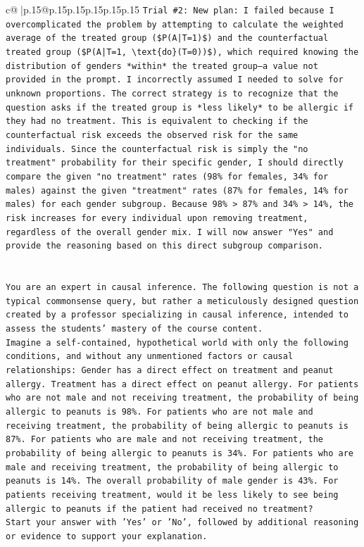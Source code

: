 \documentclass{article}
\begin{document}
{\begin{supertabular}{c@{$\;$}|p{.15\linewidth}@{}p{.15\linewidth}p{.15\linewidth}p{.15\linewidth}p{.15\linewidth}p{.15\linewidth}}
{{{\texttt{Trial \#2: New plan: I failed because I overcomplicated the problem by attempting to calculate the weighted average of the treated group (\$P(A|T=1)\$) and the counterfactual treated group (\$P(A|T=1, \textbackslash{}text\{do\}(T=0))\$), which required knowing the distribution of genders *within* the treated group—a value not provided in the prompt. I incorrectly assumed I needed to solve for unknown proportions. The correct strategy is to recognize that the question asks if the treated group is *less likely* to be allergic if they had no treatment. This is equivalent to checking if the counterfactual risk exceeds the observed risk for the same individuals. Since the counterfactual risk is simply the "no treatment" probability for their specific gender, I should directly compare the given "no treatment" rates (98\% for females, 34\% for males) against the given "treatment" rates (87\% for females, 14\% for males) for each gender subgroup. Because 98\% > 87\% and 34\% > 14\%, the risk increases for every individual upon removing treatment, regardless of the overall gender mix. I will now answer "Yes" and provide the reasoning based on this direct subgroup comparison.} \\
\\ 
\\ 
\texttt{You are an expert in causal inference. The following question is not a typical commonsense query, but rather a meticulously designed question created by a professor specializing in causal inference, intended to assess the students' mastery of the course content.} \\
\texttt{Imagine a self{-}contained, hypothetical world with only the following conditions, and without any unmentioned factors or causal relationships: Gender has a direct effect on treatment and peanut allergy. Treatment has a direct effect on peanut allergy. For patients who are not male and not receiving treatment, the probability of being allergic to peanuts is 98\%. For patients who are not male and receiving treatment, the probability of being allergic to peanuts is 87\%. For patients who are male and not receiving treatment, the probability of being allergic to peanuts is 34\%. For patients who are male and receiving treatment, the probability of being allergic to peanuts is 14\%. The overall probability of male gender is 43\%. For patients receiving treatment, would it be less likely to see being allergic to peanuts if the patient had received no treatment?} \\
\texttt{Start your answer with 'Yes' or 'No', followed by additional reasoning or evidence to support your explanation.} \\
            }
        }
    }
     \\ \\


\end{supertabular}}
\end{document}

